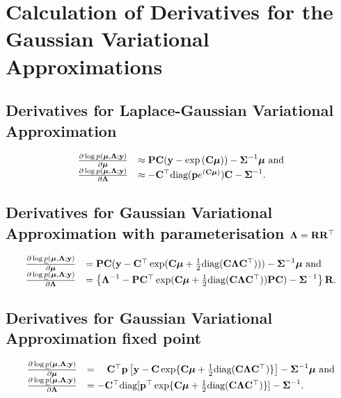 \section{Calculation of Derivatives for the Gaussian Variational Approximations}
\subsection{Derivatives for Laplace-Gaussian Variational Approximation}
\label{sec:appendix_derivatives_laplace}
\begin{equation*}
\begin{array}{ll}
	\frac{\partial \log p({\boldsymbol \mu}, {\boldsymbol \Lambda}; {\bf y})}{\partial {\boldsymbol\mu}}     & \approx {\bf P} {\bf C} ({\bf y} - \exp{({\bf C}{\boldsymbol\mu})}) - {\boldsymbol \Sigma}^{-1} {\boldsymbol \mu} \text{ and} \\
	\frac{\partial \log p({\boldsymbol \mu}, {\boldsymbol \Lambda}; {\bf y})}{\partial {\boldsymbol\Lambda}} & \approx - {\bf C}^\top \text{diag}({\bf p} e^{({\bf C} {\boldsymbol \mu})}) {\bf C} - {\boldsymbol \Sigma}^{-1}.   
\end{array}
\end{equation*}
		
\subsection{Derivatives for Gaussian Variational Approximation with parameterisation ${\boldsymbol \Lambda} = {\bf R} {\bf R}^\top$}
\label{sec:appendix_derivatives_gva}
\begin{equation*}
\begin{array}{ll}
	\frac{\partial \log \underline{p}({\boldsymbol \mu}, {\boldsymbol \Lambda}; {\bf y})}{\partial {\boldsymbol\mu}}     & = {\bf P} {\bf C} ({\bf y} - {\bf C}^\top \exp({\bf C} {\boldsymbol \mu} + \frac{1}{2} \text{diag}{({\bf C}{\boldsymbol\Lambda}{\bf C}^\top)})) - {\boldsymbol \Sigma}^{-1} {\boldsymbol \mu} \text{ and}                \\
	\frac{\partial \log \underline{p}({\boldsymbol \mu}, {\boldsymbol \Lambda}; {\bf y})}{\partial {\boldsymbol\Lambda}} & = \left \{{\boldsymbol \Lambda}^{-1} - {\bf P} {\bf C}^\top \exp({\bf C} {\boldsymbol \mu} + \frac{1}{2} \text{diag}({\bf C} {\boldsymbol \Lambda} {\bf C}^\top)) {\bf P} {\bf C}) - {\boldsymbol \Sigma}^{-1} \right \} {\bf R}. 
\end{array}
\end{equation*}

\subsection{Derivatives for Gaussian Variational Approximation fixed point}
\label{sec:appendix_derivatives_gva_fixed_point}
\begin{equation*}
\begin{array}{ll}
	\frac{\partial \log \underline{p}({\boldsymbol \mu}, {\boldsymbol \Lambda}; {\bf y})}{\partial {\boldsymbol\mu}}     & = \quad {\bf C}^\top{\bf p} \left [{\bf y} - {\bf C}\exp\{{\bf C} {\boldsymbol \mu} + \tfrac{1}{2} \text{diag}({\bf C} {\boldsymbol \Lambda} {\bf C}^\top)\} \right ] - {\boldsymbol \Sigma}^{-1} {\boldsymbol \mu} \text{ and} \\
	\frac{\partial \log \underline{p}({\boldsymbol \mu}, {\boldsymbol \Lambda}; {\bf y})}{\partial {\boldsymbol\Lambda}} & = -{\bf C}^\top \text{diag}[{\bf p}^\top \exp\{{\bf C} {\boldsymbol \mu} +\tfrac{1}{2} \text{diag}({\bf C} {\boldsymbol \Lambda} {\bf C}^\top)\}] - {\boldsymbol \Sigma}^{-1}.                             
\end{array}
\end{equation*}